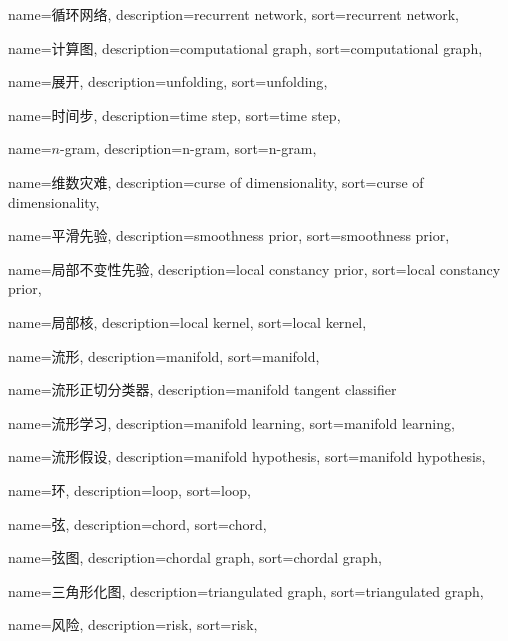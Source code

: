 {
  name=循环网络,
  description={recurrent network},
  sort={recurrent network},
}

{
  name=计算图,
  description={computational graph},
  sort={computational graph},
}

{
  name=展开,
  description={unfolding},
  sort={unfolding},
}

{
  name=时间步,
  description={time step},
  sort={time step},
}

{
  name=$n$-gram,
  description={n-gram},
  sort={n-gram},
}

{
  name=维数灾难,
  description={curse of dimensionality},
  sort={curse of dimensionality},
}

{
  name=平滑先验,
  description={smoothness prior},
  sort={smoothness prior},
}

{
  name=局部不变性先验,
  description={local constancy prior},
  sort={local constancy prior},
}

{
  name=局部核,
  description={local kernel},
  sort={local kernel},
}

{
  name=流形,
  description={manifold},
  sort={manifold},
}

{
  name=流形正切分类器,
  description={manifold tangent classifier}
}

{
  name=流形学习,
  description={manifold learning},
  sort={manifold learning},
}

{
  name=流形假设,
  description={manifold hypothesis},
  sort={manifold hypothesis},
}

{
  name=环,
  description={loop},
  sort={loop},
}

{
  name=弦,
  description={chord},
  sort={chord},
}

{
  name=弦图,
  description={chordal graph},
  sort={chordal graph},
}

{
  name=三角形化图,
  description={triangulated graph},
  sort={triangulated graph},
}

{
  name=风险,
  description={risk},
  sort={risk},
}

